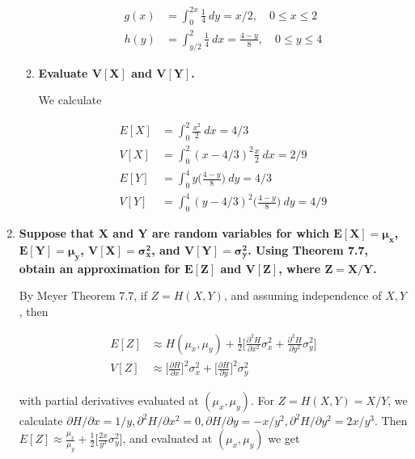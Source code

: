 \documentclass[10pt, oneside]{article}   	%
\theoremstyle{definition}
\begin{document}
\begin{enumerate}[label=7.\arabic*]
\begin{enumerate}
	  \begin{align*}
	  g(x) &= \int^{2x}_0 \frac{1}{4} \ dy = \boxed{x/2, \quad 0 \leq x \leq 2} \\
	  h(y) &= \int^2_{y/2} \frac{1}{4} \ dx = \boxed{ \frac{4 - y}{8}, \quad 0 \leq y \leq 4 }
	  \end{align*}
	  
	  \newpage
	\item  \begin{tcolorbox}[
	  colback=Cerulean!5!white,
	  colframe=Cerulean!75!black]
	  \textbf{Evaluate $\bm{V[X]}$ and $\bm{V[Y]}$.}
	  \end{tcolorbox}
	  
	  We calculate
	  
	  \begin{align*}
	  E[X] &= \int^2_0 \frac{x^2}{2} \ dx = 4/3 \\
	  V[X] &= \int^2_0 (x - 4/3)^2 \frac{x}{2} \ dx = \boxed{2/9} \\
	  E[Y] &= \int^4_0 y \Big( \frac{4-y}{8} \Big) \ dy = 4/3 \\
	  V[Y] &= \int^4_0 (y - 4/3)^2 \Big( \frac{4-y}{8} \Big) \ dy = \boxed{4/9}
	  \end{align*}
	\end{enumerate}

\item  \begin{tcolorbox}[
  colback=Cerulean!5!white,
  colframe=Cerulean!75!black]
  \textbf{Suppose that $\bm{X}$ and $\bm{Y}$ are random variables for which $\bm{E[X] = \mu_x}$, $\bm{E[Y] = \mu_y}$, $\bm{V[X] = \sigma^2_x}$, and $\bm{V[Y] = \sigma^2_y}$. Using Theorem 7.7, obtain an approximation for $\bm{E[Z]}$ and $\bm{V[Z]}$, where $\bm{Z = X/Y}$.}
  \end{tcolorbox}
  
  By Meyer Theorem 7.7, if $Z = H(X,Y)$, and assuming independence of $X,Y$, then
  
  \begin{align*}
  E[Z] &\approx H(\mu_x, \mu_y) + \frac{1}{2} \Big[ \frac{\partial^2 H}{\partial x^2} \sigma^2_x + \frac{\partial^2 H}{\partial y^2} \sigma^2_y \Big] \\
  V[Z] &\approx \Big[ \frac{\partial H}{\partial x} \Big]^2 \sigma^2_x + \Big[ \frac{\partial H}{\partial y} \Big]^2 \sigma^2_y
  \end{align*}
  
  with partial derivatives evaluated at $(\mu_x, \mu_y)$. For $Z = H(X,Y) = X/Y$, we calculate $\partial H / \partial x = 1/y, \partial^2 H / \partial x^2 = 0, \partial H / \partial y = -x / y^2, \partial^2 H / \partial y^2 = 2x / y^3$. Then $E[Z] \approx \frac{\mu_x}{\mu_y} + \frac{1}{2} \Big[ \frac{2x}{y^3} \sigma^2_y \Big]$, and evaluated at $(\mu_x, \mu_y)$ we get
  

\end{enumerate}
\end{document}
